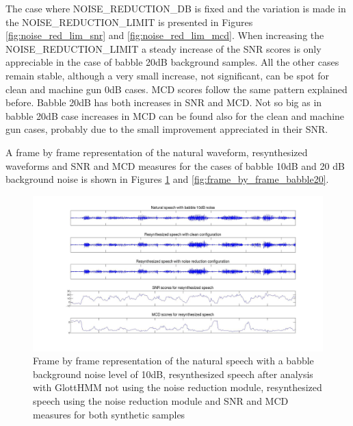 The case where NOISE\_REDUCTION\_DB is fixed and the variation is made in the NOISE\_REDUCTION\_LIMIT is presented in Figures \ref{fig:noise_red_lim_snr} and \ref{fig:noise_red_lim_mcd}.
%
When increasing the NOISE\_REDUCTION\_LIMIT a steady increase of the SNR scores is only appreciable in the case of babble 20dB background samples.
%
All the other cases remain stable, although a very small increase, not significant, can be spot for clean and machine gun 0dB cases.
%
MCD scores follow the same pattern explained before. 
%
Babble 20dB has both increases in SNR and MCD.
% 
Not so big as in babble 20dB case increases in MCD can be found also for the clean and machine gun cases, probably due to the small improvement appreciated in their SNR.

A frame by frame representation of the natural waveform, resynthesized waveforms and SNR and MCD measures for the cases of babble 10dB and 20 dB background noise is shown in Figures \ref{fig:frame_by_frame_babble10} and \ref{fig:frame_by_frame_babble20}.

\begin{figure}[!htb]
\begin{adjustwidth}{-2.6cm}{}
\includegraphics[width=1.3\textwidth]{images/babble10_frame_by_frame.jpg}
\end{adjustwidth}
\caption{Frame by frame representation of the natural speech with a babble background noise level of 10dB, resynthesized speech after analysis with GlottHMM not using the noise reduction module, resynthesized speech using the noise reduction module and SNR and MCD measures for both synthetic samples}
\label{fig:frame_by_frame_babble10}
\end{figure}


